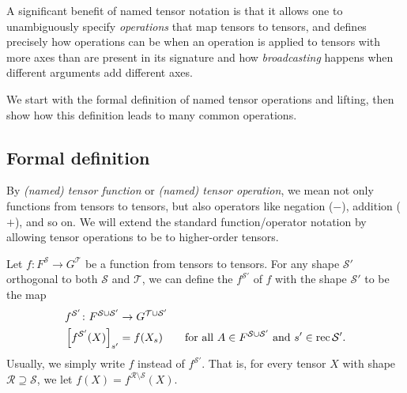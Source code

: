 A significant benefit of named tensor notation is that it allows one to unambiguously specify \emph{operations} that map tensors to tensors, and defines precisely how operations can be \emph{\liftedVBN} when an 
operation is applied to tensors with more axes than are present in its signature and how \emph{broadcasting} happens when different arguments add different axes.

We start with the formal definition of named tensor operations and lifting, then show how this definition leads to many common operations.

\subsection{Formal definition}

By \emph{(named) tensor function} or \emph{(named) tensor operation}, we mean not only functions from tensors to tensors, but also operators like negation ($-$), addition ($+$), and so on. We will extend the standard function/operator notation by allowing tensor operations to be \emph{\liftedVBN} to higher-order tensors.

\begin{definition} \label{def:lifting}
Let $f \colon F^{\mathcal{S}} \rightarrow G^{\mathcal{T}}$ be a function from tensors to tensors. For any shape $\mathcal{S'}$ orthogonal to both $\mathcal{S}$ and $\mathcal{T}$, we can define the \emph{\liftNN} $f^{\mathcal{S'}}$ of $f$ with the shape $\mathcal{S'}$ to be the map
\begin{align*}
f^{\mathcal{S'}} \colon F^{\mathcal{S} \cup \mathcal{S'}} &\rightarrow G^{\mathcal{T} \cup \mathcal{S'}} \\
\left[f^{\mathcal{S'}}(X)\right]_{s'} &= f(X_s) \qquad \text{for all $A \in F^{\mathcal{S}\cup\mathcal{S'}}$ and  $s' \in \operatorname{rec}\mathcal{S'}$.}
\end{align*}
Usually, we simply write $f$ instead of $f^{\mathcal{S'}}$. That is, for every tensor $X$ with shape  $\mathcal{R} \supseteq \mathcal{S}$, we let $f(X) = f^{\mathcal{R} \setminus \mathcal{S}}(X)$.
\end{definition}

